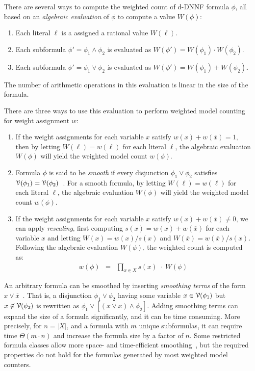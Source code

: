 \documentclass[letterpaper,USenglish,cleveref, autoref, thm-restate]{lipics-v2021}
\newcommand{\obar}[1]{\overline{#1}}
\newcommand{\lit}{\ell}
\newcommand{\varset}{X}
\newcommand{\dependencyset}{{\cal V}}
\begin{document}
There are several ways to compute the weighted count of d-DNNF formula $\phi$, all
based on an \emph{algebraic evaluation} of $\phi$ to compute a value $W(\phi)$:
\begin{enumerate}
\item Each literal $\lit$ is a assigned a rational value $W(\lit)$.
\item Each subformula $\phi' = \phi_1 \land \phi_2$ is evaluated as $W(\phi') = W(\phi_1) \cdot W(\phi_2)$.
\item Each subformula $\phi' = \phi_1 \lor \phi_2$ is evaluated as $W(\phi') = W(\phi_1) + W(\phi_2)$.
\end{enumerate}
The number of arithmetic operations in this evaluation is linear in the size of the formula.

There are three ways to use this evaluation to perform weighted model counting for weight assignment $w$:
\begin{enumerate}
\item If the weight assignments for each variable $x$ satisfy $w(x) + w(\obar{x}) = 1$,
  then by letting $W(\lit) = w(\lit)$ for each literal $\lit$, the algebraic evaluation $W(\phi)$ will yield the weighted model count $w(\phi)$.
\item Formula $\phi$ is said to be \emph{smooth} if every disjunction $\phi_1 \lor \phi_2$ satisfies
  $\dependencyset(\phi_1) = \dependencyset(\phi_2)$~\cite{darwiche:jancl:2001,darwiche:jair:2002}.  For a smooth formula, 
by letting $W(\lit) = w(\lit)$ for each literal $\lit$, the algebraic evaluation $W(\phi)$ will yield the weighted model count $w(\phi)$.
\item If the weight assignments for each variable $x$ satisfy $w(x) + w(\obar{x}) \not = 0$,
  we can apply \emph{rescaling}, first computing $s(x) = w(x) + w(\obar{x})$ for each variable $x$
  and letting $W(x) = w(x)/s(x)$ and $W(\obar{x}) = w(\obar{x})/s(x)$.  
  Following the algebraic evaluation $W(\phi)$, the weighted count is computed as:
  \begin{eqnarray}
w(\phi) &=& \prod_{x\in\varset} s(x) \; \cdot \; W(\phi) \label{eqn:rescale}
  \end{eqnarray}
\end{enumerate}

An arbitrary formula can be smoothed by inserting \emph{smoothing terms} of the form $x \lor \obar{x}$~\cite{darwiche:jancl:2001}.
That is,
  a disjunction $\phi_1 \lor \phi_2$ having some variable $x \in \dependencyset(\phi_1)$ but
  $x \not\in \dependencyset(\phi_2)$ is rewritten as $\phi_1 \lor [(x \lor \obar{x}) \land \phi_2]$.
  Adding smoothing terms can expand the size of a formula significantly, and it can be time consuming.
  More precisely, for $n = |X|$, and a formula with $m$ unique subformulas, it can require time $\Theta(m\cdot n)$ and increase the formula size by a factor of $n$.
  Some restricted formula classes allow more space- and time-efficient smoothing~\cite{shih:neurips:2019}, but the required properties do not hold for the formulas generated by most weighted model counters.
  
\end{document}
